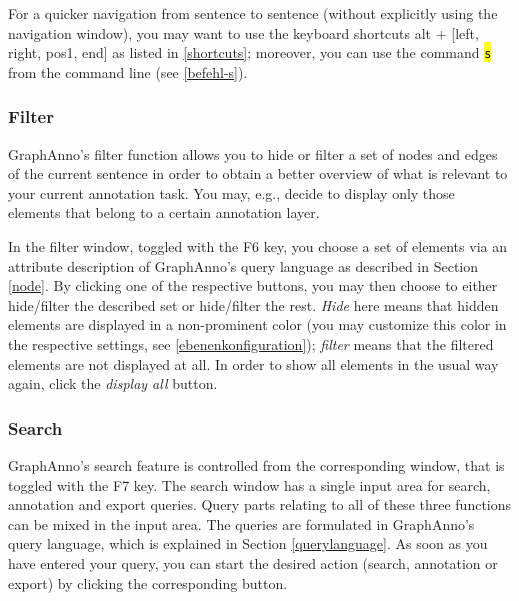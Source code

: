 \documentclass[12pt]{scrartcl}
\newcommand{\code}[1]{\hl{\texttt{#1}}}
\begin{document}
For a quicker navigation from sentence to sentence (without explicitly using the navigation window), you may want to use the keyboard shortcuts alt + [left, right, pos1, end] as listed in \ref{shortcuts}; moreover, you can use the command \code{s} from the command line (see \ref{befehl-s}).

\subsubsection{Filter}

GraphAnno’s filter function allows you to hide or filter a set of nodes and edges of the current sentence in order to obtain a better overview of what is relevant to your current annotation task.
You may, e.g., decide to display only those elements that belong to a certain annotation layer.

In the filter window, toggled with the F6 key, you choose a set of elements via an attribute description of GraphAnno’s query language as described in Section \ref{node}.
By clicking one of the respective buttons, you may then choose to either hide/filter the described set or hide/filter the rest.
\textit{Hide} here means that hidden elements are displayed in a non-prominent color (you may customize this color in the respective settings, see \ref{ebenenkonfiguration}); \textit{filter} means that the filtered elements are not displayed at all.
In order to show all elements in the usual way again, click the \textit{display all} button.

\subsubsection{Search}\label{window-search}

GraphAnno’s search feature is controlled from the corresponding window, that is toggled with the F7 key.
The search window has a single input area for search, annotation and export queries.
Query parts relating to all of these three functions can be mixed in the input area.
The queries are formulated in GraphAnno’s query language, which is explained in Section \ref{querylanguage}.
As soon as you have entered your query, you can start the desired action (search, annotation or export) by clicking the corresponding button.
\end{document}
